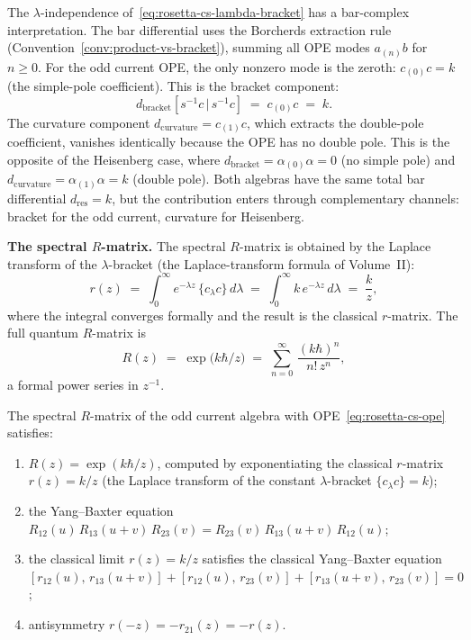 The $\lambda$-independence of~\eqref{eq:rosetta-cs-lambda-bracket}
has a bar-complex interpretation.
The bar differential uses the Borcherds extraction rule
(Convention~\ref{conv:product-vs-bracket}), summing all OPE
modes $a_{(n)}b$ for $n \geq 0$. For the odd current OPE, the
only nonzero mode is the zeroth: $c_{(0)}c = k$ (the
simple-pole coefficient). This is the bracket component:
\[
d_{\mathrm{bracket}}[s^{-1}c \,|\, s^{-1}c]
\;=\;
c_{(0)}c
\;=\;
k.
\]
The curvature component $d_{\mathrm{curvature}} = c_{(1)}c$,
which extracts the double-pole coefficient, vanishes identically
because the OPE has no double pole.
This is the opposite of the Heisenberg case, where
$d_{\mathrm{bracket}} = \alpha_{(0)}\alpha = 0$ (no simple pole)
and $d_{\mathrm{curvature}} = \alpha_{(1)}\alpha = k$
(double pole). Both algebras have the same total bar differential
$d_{\mathrm{res}} = k$, but the contribution enters through
complementary channels: bracket for the odd current, curvature for
Heisenberg.

\medskip
\noindent\textbf{The spectral $R$-matrix.}\enspace
The spectral $R$-matrix is obtained by the Laplace
transform of the $\lambda$-bracket
(the Laplace-transform formula of Volume~II):
\begin{equation}\label{eq:rosetta-cs-laplace}
r(z)
\;=\;
\int_0^\infty e^{-\lambda z}\,
\{c {}_\lambda c\}\, d\lambda
\;=\;
\int_0^\infty k\, e^{-\lambda z}\, d\lambda
\;=\;
\frac{k}{z},
\end{equation}
where the integral converges formally and the result is the
classical $r$-matrix. The full quantum $R$-matrix is
\begin{equation}\label{eq:rosetta-cs-R}
R(z) \;=\; \exp\!\bigl(k\hbar/z\bigr)
\;=\;
\sum_{n=0}^{\infty}\,
\frac{(k\hbar)^n}{n!\,z^n},
\end{equation}
a formal power series in $z^{-1}$.

\begin{theorem}
\label{thm:rosetta-cs-r-matrix}
The spectral $R$-matrix of the odd current
algebra with OPE~\eqref{eq:rosetta-cs-ope} satisfies:
\begin{enumerate}[label=\textup{(\roman*)}]
\item $R(z) = \exp(k\hbar/z)$, computed by exponentiating the classical
 $r$-matrix $r(z) = k/z$ (the Laplace transform of
 the constant $\lambda$-bracket $\{c {}_\lambda c\} = k$);
\item the Yang--Baxter equation
 $R_{12}(u)\,R_{13}(u+v)\,R_{23}(v) =
 R_{23}(v)\,R_{13}(u+v)\,R_{12}(u)$;
\item the classical limit $r(z) = k/z$ satisfies the classical
 Yang--Baxter equation
 $[r_{12}(u),\, r_{13}(u+v)] + [r_{12}(u),\, r_{23}(v)]
 + [r_{13}(u+v),\, r_{23}(v)] = 0$;
\item antisymmetry $r(-z) = -r_{21}(z) = -r(z)$.
\end{enumerate}
\end{theorem}

